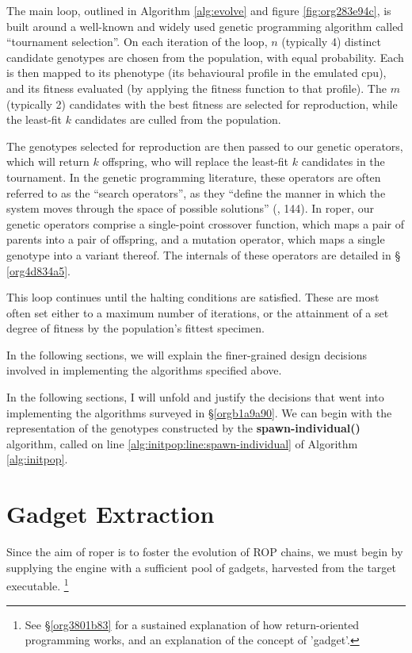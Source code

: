 \documentclass[12pt,glossary]{dalthesis}
\begin{document}
The main loop, outlined in Algorithm \ref{alg:evolve} and figure \ref{fig:org283e94c},
is built around a well-known and widely used genetic programming algorithm
called ``tournament selection''. On each iteration of the loop, \(n\) (typically 4)
distinct candidate genotypes are chosen from the population, with equal
probability. Each is then mapped to its phenotype (its behavioural profile in
the emulated \gls{cpu}), and its fitness evaluated (by applying the fitness
function to that profile). The \(m\) (typically 2) candidates with the best
fitness are selected for reproduction, while the least-fit \(k\) candidates are
culled from the population.

The genotypes selected for reproduction are then passed to our genetic
operators, which will return \(k\) offspring, who will replace the least-fit \(k\)
candidates in the tournament. In the genetic programming literature, these
operators are often referred to as the ``search operators'', as they ``define the
manner in which the system moves through the space of possible solutions''
(\cite{banzhaf98}, 144). In \gls{roper}, our genetic operators comprise a
single-point crossover function, which maps a pair of parents into a pair of
offspring, and a mutation operator, which maps a single genotype into a variant
thereof. The internals of these operators are detailed in \S
\ref{org4d834a5}.

This loop continues until the halting conditions are satisfied. These are most
often set either to a maximum number of iterations, or the attainment of a set
degree of fitness by the population's fittest specimen.

In the following sections, we will explain the finer-grained design decisions
involved in implementing the algorithms specified above. 

In the following sections, I will unfold and justify the decisions that went into
implementing the algorithms surveyed in \S \ref{orgb1a9a90}.
We can begin with the representation of the genotypes constructed by
the \textbf{spawn-individual()} algorithm, called on line
\ref{alg:initpop:line:spawn-individual} of Algorithm \ref{alg:initpop}.

\section{Gadget Extraction}
\label{sec:org3b374b2}
\label{orgf454284}

Since the aim of \gls{roper} is to foster the evolution of ROP chains, we 
must begin by supplying the engine with a sufficient pool of gadgets, 
harvested from the target executable. 
  \footnote{See \S \ref{org3801b83} for a sustained explanation of how return-oriented
  programming works, and an explanation of the concept of 'gadget'.}
\end{document}
